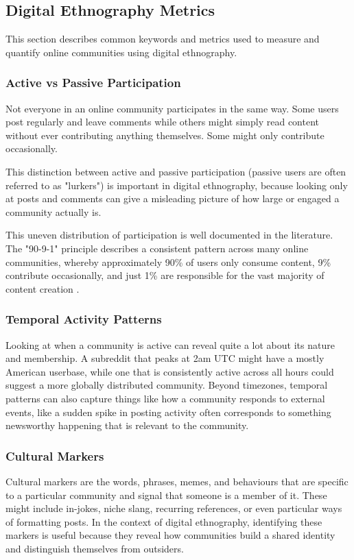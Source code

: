 \documentclass[12pt, a4paper]{article}
\begin{document}
\subsection{Digital Ethnography Metrics}
This section describes common keywords and metrics used to measure and quantify online communities using digital ethnography.

\subsubsection{Active vs Passive Participation}
\label{sec:passive_participation}
Not everyone in an online community participates in the same way. Some users post regularly and leave comments while others might simply read content without ever contributing anything themselves. Some might only contribute occasionally.

This distinction between active and passive participation (passive users are often referred to as "lurkers") is important in digital ethnography, because looking only at posts and comments can give a misleading picture of how large or engaged a community actually is.

This uneven distribution of participation is well documented in the literature. The "90-9-1" principle describes a consistent pattern across many online communities, whereby approximately 90\% of users only consume content, 9\% contribute occasionally, and just 1\% are responsible for the vast majority of content creation \cite{sun2014lurkers}.

\subsubsection{Temporal Activity Patterns}
Looking at when a community is active can reveal quite a lot about its nature and membership. A subreddit that peaks at 2am UTC might have a mostly American userbase, while one that is consistently active across all hours could suggest a more globally distributed community. Beyond timezones, temporal patterns can also capture things like how a community responds to external events, like a sudden spike in posting activity often corresponds to something newsworthy happening that is relevant to the community.

\subsubsection{Cultural Markers}
\label{sec:cultural_markers}
Cultural markers are the words, phrases, memes, and behaviours that are specific to a particular community and signal that someone is a member of it. These might include in-jokes, niche slang, recurring references, or even particular ways of formatting posts. In the context of digital ethnography, identifying these markers is useful because they reveal how communities build a shared identity and distinguish themselves from outsiders.
\end{document}
